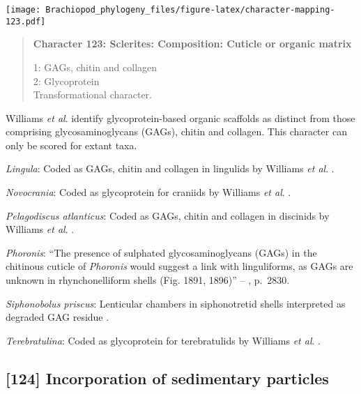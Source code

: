 \documentclass[openany]{book}
\theoremstyle{definition}
\theoremstyle{definition}
\theoremstyle{definition}
\theoremstyle{remark}
\begin{document}
\texttt{[image: Brachiopod\_phylogeny\_files/figure-latex/character-mapping-123.pdf]}

\begin{quote}
\textbf{Character 123: Sclerites: Composition: Cuticle or organic
matrix}

1: GAGs, chitin and collagen\\
2: Glycoprotein\\
Transformational character.
\end{quote}

Williams \emph{et al}. \citeyearpar{Williams1996Asupra} identify
glycoprotein-based organic scaffolds as distinct from those comprising
glycosaminoglycans (GAGs), chitin and collagen. This character can only
be scored for extant taxa.

\hypertarget{Lingula-coding-123}{}
\emph{Lingula}: Coded as GAGs, chitin and collagen in lingulids by
Williams \emph{et al}. \citeyearpar{Williams1996Asupra}.

\hypertarget{Novocrania-coding-123}{}
\emph{Novocrania}: Coded as glycoprotein for craniids by Williams
\emph{et al}. \citeyearpar{Williams1996Asupra}.

\hypertarget{Pelagodiscus_atlanticus-coding-123}{}
\emph{Pelagodiscus atlanticus}: Coded as GAGs, chitin and collagen in
discinids by Williams \emph{et al}. \citeyearpar{Williams1996Asupra}.

\hypertarget{Phoronis-coding-123}{}
\emph{Phoronis}: ``The presence of sulphated glycosaminoglycans (GAGs)
in the chitinous cuticle of \emph{Phoronis}
\citep[p.~215]{Herrmann1997Phoronida} would suggest a link with
linguliforms, as GAGs are unknown in rhynchonelliform shells (Fig. 1891,
1896)'' -- \citet{Williams2007Supplement}, p.~2830.

\hypertarget{Siphonobolus_priscus-coding-123}{}
\emph{Siphonobolus priscus}: Lenticular chambers in siphonotretid shells
interpreted as degraded GAG residue
\citep{Williams2004Chemicostructure}.

\hypertarget{Terebratulina-coding-123}{}
\emph{Terebratulina}: Coded as glycoprotein for terebratulids by
Williams \emph{et al}. \citeyearpar{Williams1996Asupra}.

\subsection*{{[}124{]} Incorporation of sedimentary
particles}\label{incorporation-of-sedimentary-particles}
\end{document}

